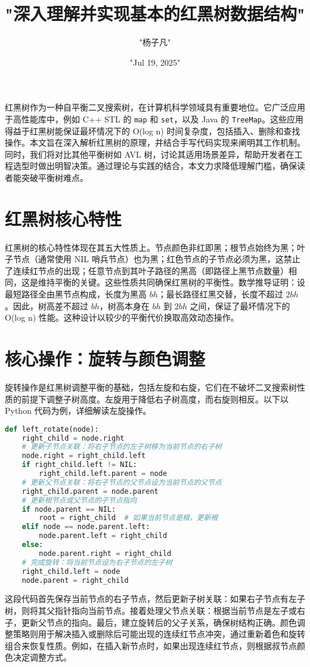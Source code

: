 \title{"深入理解并实现基本的红黑树数据结构"}
\author{"杨子凡"}
\date{"Jul 19, 2025"}
\maketitle
红黑树作为一种自平衡二叉搜索树，在计算机科学领域具有重要地位。它广泛应用于高性能库中，例如 C++ STL 的 \texttt{map} 和 \texttt{set}，以及 Java 的 \texttt{TreeMap}。这些应用得益于红黑树能保证最坏情况下的 O(log n) 时间复杂度，包括插入、删除和查找操作。本文旨在深入解析红黑树的原理，并结合手写代码实现来阐明其工作机制。同时，我们将对比其他平衡树如 AVL 树，讨论其适用场景差异，帮助开发者在工程选型时做出明智决策。通过理论与实践的结合，本文力求降低理解门槛，确保读者能突破平衡树难点。\par
\chapter{红黑树核心特性}
红黑树的核心特性体现在其五大性质上。节点颜色非红即黑；根节点始终为黑；叶子节点（通常使用 NIL 哨兵节点）也为黑；红色节点的子节点必须为黑，这禁止了连续红节点的出现；任意节点到其叶子路径的黑高（即路径上黑节点数量）相同，这是维持平衡的关键。这些性质共同确保红黑树的平衡性。数学推导证明：设最短路径全由黑节点构成，长度为黑高 $bh$；最长路径红黑交替，长度不超过 $2bh$。因此，树高差不超过 $bh$，树高本身在 $bh$ 到 $2bh$ 之间，保证了最坏情况下的 O(log n) 性能。这种设计以较少的平衡代价换取高效动态操作。\par
\chapter{核心操作：旋转与颜色调整}
旋转操作是红黑树调整平衡的基础，包括左旋和右旋，它们在不破坏二叉搜索树性质的前提下调整子树高度。左旋用于降低右子树高度，而右旋则相反。以下以 Python 代码为例，详细解读左旋操作。\par
\begin{lstlisting}[language=python]
def left_rotate(node):
    right_child = node.right
    # 更新子节点关联：将右子节点的左子树移为当前节点的右子树
    node.right = right_child.left
    if right_child.left != NIL:
        right_child.left.parent = node
    # 更新父节点关联：将右子节点的父节点设为当前节点的父节点
    right_child.parent = node.parent
    # 更新根节点或父节点的子节点指向
    if node.parent == NIL:
        root = right_child  # 如果当前节点是根，更新根
    elif node == node.parent.left:
        node.parent.left = right_child
    else:
        node.parent.right = right_child
    # 完成旋转：将当前节点设为右子节点的左子树
    right_child.left = node
    node.parent = right_child
\end{lstlisting}
这段代码首先保存当前节点的右子节点，然后更新子树关联：如果右子节点有左子树，则将其父指针指向当前节点。接着处理父节点关联：根据当前节点是左子或右子，更新父节点的指向。最后，建立旋转后的父子关系，确保树结构正确。颜色调整策略则用于解决插入或删除后可能出现的连续红节点冲突，通过重新着色和旋转组合来恢复性质。例如，在插入新节点时，如果出现连续红节点，则根据叔节点颜色决定调整方式。\par
